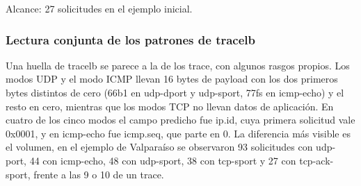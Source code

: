 Alcance: 27 solicitudes en el ejemplo inicial.

\subsubsection{Lectura conjunta de los patrones de tracelb}

Una huella de tracelb se parece a la de los trace, con algunos rasgos propios. Los modos UDP y el modo ICMP llevan 16 bytes de payload con los dos primeros bytes distintos de cero (66b1 en udp-dport y udp-sport, 77fs en icmp-echo) y el resto en cero, mientras que los modos TCP no llevan datos de aplicación. En cuatro de los cinco modos el campo predicho fue ip.id, cuya primera solicitud vale 0x0001, y en icmp-echo fue icmp.seq, que parte en 0.
La diferencia más visible es el volumen, en el ejemplo de Valparaíso se observaron 93 solicitudes con udp-port, 44 con icmp-echo, 48 con udp-sport, 38 con tcp-sport y 27 con tcp-ack-sport, frente a las 9 o 10 de un trace.
